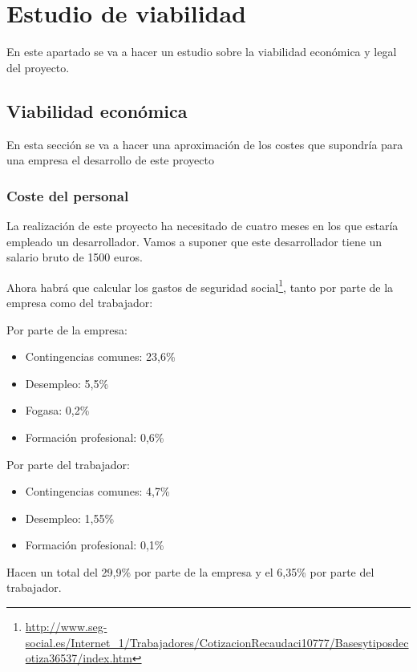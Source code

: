 \newpage

\section{Estudio de viabilidad}

En este apartado se va a hacer un estudio sobre la viabilidad económica y legal del proyecto.

\subsection{Viabilidad económica}

En esta sección se va a hacer una aproximación de los costes que supondría para una empresa el desarrollo de este proyecto

\subsubsection{Coste del personal}

La realización de este proyecto ha necesitado de cuatro meses en los que estaría empleado un desarrollador. Vamos a suponer que este desarrollador tiene un salario bruto de 1500 euros.

Ahora habrá que calcular los gastos de seguridad social\footnote{\url{http://www.seg-social.es/Internet_1/Trabajadores/CotizacionRecaudaci10777/Basesytiposdecotiza36537/index.htm}}, tanto por parte de la empresa como del trabajador:

Por parte de la empresa:

\begin{itemize}
	\item Contingencias comunes: 23,6\%
	\item Desempleo: 5,5\%
	\item Fogasa: 0,2\%
	\item Formación profesional: 0,6\%
\end{itemize}

Por parte del trabajador:

\begin{itemize}
	\item Contingencias comunes: 4,7\%
	\item Desempleo: 1,55\%
	\item Formación profesional: 0,1\%
\end{itemize}

Hacen un total del 29,9\% por parte de la empresa y el 6,35\% por parte del trabajador.

